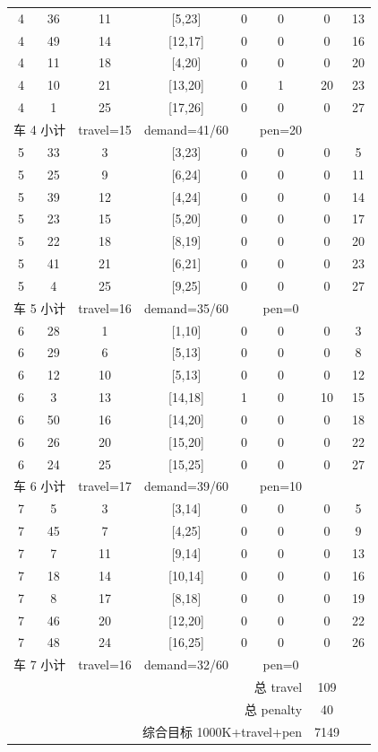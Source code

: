 \begin{table}[htbp]
\begin{tabular}{cccccccc}
4 & 36 & 11 & [5,23] & 0 & 0 & 0 & 13 \\
4 & 49 & 14 & [12,17] & 0 & 0 & 0 & 16 \\
4 & 11 & 18 & [4,20] & 0 & 0 & 0 & 20 \\
4 & 10 & 21 & [13,20] & 0 & 1 & 20 & 23 \\
4 & 1 & 25 & [17,26] & 0 & 0 & 0 & 27 \\
\multicolumn{2}{r}{车 4 小计} & travel=15 & demand=41/60 & & pen=20 & \\
\midrule
5 & 33 & 3 & [3,23] & 0 & 0 & 0 & 5 \\
5 & 25 & 9 & [6,24] & 0 & 0 & 0 & 11 \\
5 & 39 & 12 & [4,24] & 0 & 0 & 0 & 14 \\
5 & 23 & 15 & [5,20] & 0 & 0 & 0 & 17 \\
5 & 22 & 18 & [8,19] & 0 & 0 & 0 & 20 \\
5 & 41 & 21 & [6,21] & 0 & 0 & 0 & 23 \\
5 & 4 & 25 & [9,25] & 0 & 0 & 0 & 27 \\
\multicolumn{2}{r}{车 5 小计} & travel=16 & demand=35/60 & & pen=0 & \\
\midrule
6 & 28 & 1 & [1,10] & 0 & 0 & 0 & 3 \\
6 & 29 & 6 & [5,13] & 0 & 0 & 0 & 8 \\
6 & 12 & 10 & [5,13] & 0 & 0 & 0 & 12 \\
6 & 3 & 13 & [14,18] & 1 & 0 & 10 & 15 \\
6 & 50 & 16 & [14,20] & 0 & 0 & 0 & 18 \\
6 & 26 & 20 & [15,20] & 0 & 0 & 0 & 22 \\
6 & 24 & 25 & [15,25] & 0 & 0 & 0 & 27 \\
\multicolumn{2}{r}{车 6 小计} & travel=17 & demand=39/60 & & pen=10 & \\
\midrule
7 & 5 & 3 & [3,14] & 0 & 0 & 0 & 5 \\
7 & 45 & 7 & [4,25] & 0 & 0 & 0 & 9 \\
7 & 7 & 11 & [9,14] & 0 & 0 & 0 & 13 \\
7 & 18 & 14 & [10,14] & 0 & 0 & 0 & 16 \\
7 & 8 & 17 & [8,18] & 0 & 0 & 0 & 19 \\
7 & 46 & 20 & [12,20] & 0 & 0 & 0 & 22 \\
7 & 48 & 24 & [16,25] & 0 & 0 & 0 & 26 \\
\multicolumn{2}{r}{车 7 小计} & travel=16 & demand=32/60 & & pen=0 & \\
\midrule
\multicolumn{6}{r}{总 travel} & 109 & \\
\multicolumn{6}{r}{总 penalty} & 40 & \\
\multicolumn{6}{r}{综合目标 1000K+travel+pen} & 7149 & \\
\bottomrule
\end{tabular}
\end{table}
